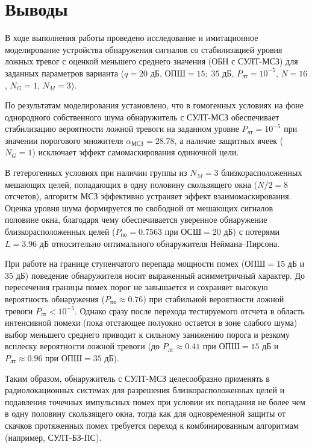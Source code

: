 \section{Выводы}

В ходе выполнения работы проведено исследование и имитационное моделирование устройства обнаружения сигналов со стабилизацией уровня ложных тревог с оценкой меньшего среднего значения (ОБН с СУЛТ-МСЗ) для заданных параметров варианта ($q = 20\text{ дБ}$, $\text{ОПШ} = 15;\; 35\text{ дБ}$, $P_{\text{лт}} = 10^{-5}$, $N = 16$, $N_G = 1$, $N_M = 3$).

По результатам моделирования установлено, что в гомогенных условиях на фоне однородного собственного шума обнаружитель с СУЛТ-МСЗ обеспечивает стабилизацию вероятности ложной тревоги на заданном уровне $P_{\text{лт}} = 10^{-5}$ при значении порогового множителя $\alpha_{\text{МСЗ}} = 28.78$, а наличие защитных ячеек ($N_G = 1$) исключает эффект самомаскирования одиночной цели.

В гетерогенных условиях при наличии группы из $N_M = 3$ близкорасположенных мешающих целей, попадающих в одну половину скользящего окна ($N/2 = 8$ отсчетов), алгоритм МСЗ эффективно устраняет эффект взаимомаскирования. Оценка уровня шума формируется по свободной от мешающих сигналов половине окна, благодаря чему обеспечивается уверенное обнаружение близкорасположенных целей ($P_{\text{по}} = 0.7563$ при $\text{ОСШ} = 20\text{ дБ}$) с потерями $L = 3.96\text{ дБ}$ относительно оптимального обнаружителя Неймана--Пирсона.

При работе на границе ступенчатого перепада мощности помех ($\text{ОПШ} = 15\text{ дБ}$ и $35\text{ дБ}$) поведение обнаружителя носит выраженный асимметричный характер. До пересечения границы помех порог не завышается и сохраняет высокую вероятность обнаружения ($P_{\text{по}} \approx 0.76$) при стабильной вероятности ложной тревоги $P_{\text{лт}} < 10^{-5}$. Однако сразу после перехода тестируемого отсчета в область интенсивной помехи (пока отстающее полуокно остается в зоне слабого шума) выбор меньшего среднего приводит к сильному занижению порога и резкому всплеску вероятности ложной тревоги (до $P_{\text{лт}} \approx 0.41$ при $\text{ОПШ} = 15\text{ дБ}$ и $P_{\text{лт}} \approx 0.96$ при $\text{ОПШ} = 35\text{ дБ}$).

Таким образом, обнаружитель с СУЛТ-МСЗ целесообразно применять в радиолокационных системах для разрешения близкорасположенных целей и подавления точечных импульсных помех при условии их попадания не более чем в одну половину скользящего окна, тогда как для одновременной защиты от скачков протяженных помех требуется переход к комбинированным алгоритмам (например, СУЛТ-БЗ-ПС).

